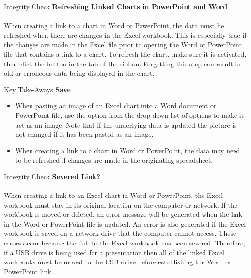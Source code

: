 \begin{center}
	\begin{infobox}{Integrity Check}
		\textbf{Refreshing Linked Charts in PowerPoint and Word}
		\\
		\\
		When creating a link to a chart in Word or PowerPoint, the data must be refreshed when there are changes in the Excel workbook. This is especially true if the changes are made in the Excel file prior to opening the Word or PowerPoint file that contains a link to a chart. To refresh the chart, make sure it is activated, then click the  button in the  tab of the ribbon. Forgetting this step can result in old or erroneous data being displayed in the chart.
	\end{infobox}
\end{center}

\begin{center}
	\begin{tkwbox}{Key Take-Aways}
		\textbf{Save}
		\\
		\begin{itemize}
			\setlength{\itemsep}{0pt}
			\setlength{\parskip}{0pt}
			\setlength{\parsep}{0pt}

			\item When pasting an image of an Excel chart into a Word document or PowerPoint file, use the  option from the  drop-down list of options to make it act as an image. Note that if the underlying data is updated the picture is not changed if it has been pasted as an image.
			\item When creating a link to a chart in Word or PowerPoint, the data may need to be refreshed if changes are made in the originating spreadsheet. 
					
		\end{itemize}
	\end{tkwbox}
\end{center}

\begin{center}
	\begin{infobox}{Integrity Check}
		\textbf{Severed Link?}
		\\
		\\
		When creating a link to an Excel chart in Word or PowerPoint, the Excel workbook must stay in its original location on the computer or network. If the workbook is moved or deleted, an error message will be generated when the link in the Word or PowerPoint file is updated. An error is also generated if the Excel workbook is saved on a network drive that the computer cannot access. These errors occur because the link to the Excel workbook has been severed. Therefore, if a USB drive is being used for a presentation then all of the linked Excel workbooks must be moved to the USB drive before establishing the Word or PowerPoint link.
	\end{infobox}
\end{center}

